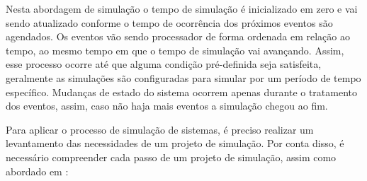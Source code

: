 \documentclass[pt,disc,oneside]{ufscpgeasthesis}
\begin{document}
			Nesta abordagem de simulação o tempo de simulação é inicializado em zero e vai sendo atualizado conforme o tempo de ocorrência dos próximos eventos são agendados.
			Os eventos vão sendo processador de forma ordenada em relação ao tempo, ao mesmo tempo em que o tempo de simulação vai avançando.
			Assim, esse processo ocorre até que alguma condição pré-definida seja satisfeita, geralmente as simulações são configuradas para simular por um período de tempo específico.
			Mudanças de estado do sistema ocorrem apenas durante o tratamento dos eventos, assim, caso não haja mais eventos a simulação chegou ao fim.
 
			Para aplicar o processo de simulação de sistemas, é preciso realizar um levantamento das necessidades de um projeto de simulação.
			Por conta disso, é necessário compreender cada passo de um projeto de simulação, assim como abordado em \cite{Freitas}:
 
\end{document}
